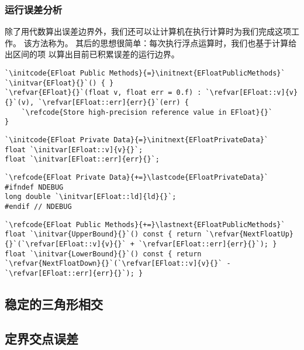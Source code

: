 \subsubsection*{运行误差分析}
除了用代数算出误差边界外，我们还可以让计算机在执行计算时为我们完成这项工作。
该方法称为。
其后的思想很简单：每次执行浮点运算时，我们也基于计算给出区间的项
以算出目前已积累误差的运行边界。

\begin{lstlisting}
`\initcode{EFloat Public Methods}{=}\initnext{EFloatPublicMethods}`
`\initvar{EFloat}{}`() { }
`\refvar{EFloat}{}`(float v, float err = 0.f) : `\refvar[EFloat::v]{v}{}`(v), `\refvar[EFloat::err]{err}{}`(err) {
    `\refcode{Store high-precision reference value in EFloat}{}`
}
\end{lstlisting}

\begin{lstlisting}
`\initcode{EFloat Private Data}{=}\initnext{EFloatPrivateData}`
float `\initvar[EFloat::v]{v}{}`;
float `\initvar[EFloat::err]{err}{}`;
\end{lstlisting}

\begin{lstlisting}
`\refcode{EFloat Private Data}{+=}\lastcode{EFloatPrivateData}`
#ifndef NDEBUG
long double `\initvar[EFloat::ld]{ld}{}`;
#endif // NDEBUG
\end{lstlisting}

\begin{lstlisting}
`\refcode{EFloat Public Methods}{+=}\lastnext{EFloatPublicMethods}`
float `\initvar{UpperBound}{}`() const { return `\refvar{NextFloatUp}{}`(`\refvar[EFloat::v]{v}{}` + `\refvar[EFloat::err]{err}{}`); }
float `\initvar{LowerBound}{}`() const { return `\refvar{NextFloatDown}{}`(`\refvar[EFloat::v]{v}{}` - `\refvar[EFloat::err]{err}{}`); }
\end{lstlisting}

\subsection{稳定的三角形相交}\label{sub:稳定的三角形相交}

\subsection{定界交点误差}\label{sub:定界交点误差}